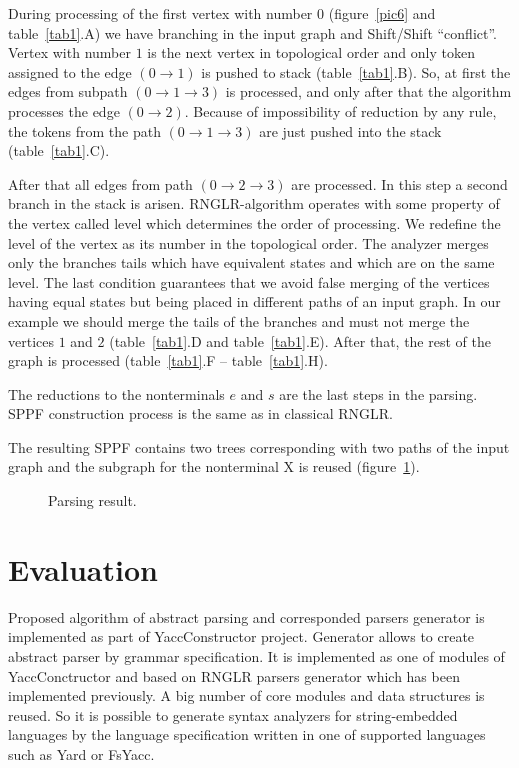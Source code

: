 \documentclass{acm_proc_article-sp}
\begin{document}
During processing of the first vertex with number 0 (figure~\ref{pic6} and table~\ref{tab1}.A) we have branching in the input graph and  Shift/Shift ``conflict''. Vertex with number $1$ is the next vertex in topological order and only token  assigned to the edge $(0 \rightarrow 1)$ is pushed to stack (table~\ref{tab1}.B). So, at first the edges from subpath $(0 \rightarrow 1 \rightarrow 3)$ is processed, and only after that the algorithm processes the edge $(0 \rightarrow 2)$. Because of impossibility of reduction by any rule, the tokens from the path $(0 \rightarrow 1 \rightarrow 3)$ are just pushed into the stack (table~\ref{tab1}.C).


After that all edges from path $(0 \rightarrow 2 \rightarrow 3)$ are processed. In this step a second branch in the stack is arisen. RNGLR-algorithm operates with some property of the vertex called level which determines the order of processing. We redefine the level of the vertex as its number in the topological order. The analyzer merges only the branches tails which have equivalent states and which are on the same level. The last condition guarantees that we avoid false merging of the vertices having equal states but being placed in different paths of an input graph. In our example we should merge the tails of the branches and must not merge the vertices $1$ and $2$ (table~\ref{tab1}.D and table~\ref{tab1}.E). After that, the rest of the graph is processed (table~\ref{tab1}.F -- table~\ref{tab1}.H).


The reductions to the nonterminals $e$ and $s$ are the last steps in the parsing. SPPF construction process is the same as in classical RNGLR.

The resulting SPPF contains two trees corresponding with two paths of the input graph and the subgraph for the nonterminal X is reused (figure~\ref{pic7}).

\begin{figure}
    \centering

    \caption{Parsing result.}
    \label{pic7}
\end{figure}

\section{Evaluation}

Proposed algorithm of abstract parsing and corresponded parsers generator is implemented as part of YaccConstructor project. Generator allows to create abstract parser by grammar specification. It is implemented as one of modules of YaccConctructor and based on RNGLR parsers generator which  has been implemented previously. A big number of core modules and data structures is reused. So it is possible to generate syntax analyzers for string-embedded languages by the language specification written in one of supported languages such as Yard or FsYacc.
\end{document}
